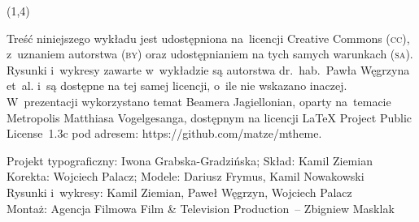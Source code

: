 {\begin{frame}[standout]
\begin{textblock}{4.2}
    \end{textblock}





    \begin{textblock}{11}(1,4)

      \begin{flushleft}

        \mdseries

        \footnotesize

        \RaggedRight

        \color{jFrametitleFGColor}

        Treść niniejszego wykładu jest udostępniona na~licencji
        Creative Commons (\textsc{cc}), z~uzna\-niem autorstwa
        (\textsc{by}) oraz udostępnianiem na tych samych warunkach
        (\textsc{sa}). Rysunki i~wy\-kresy zawarte w~wykładzie są
        autorstwa dr.~hab.~Pawła Węgrzyna et~al. i~są dostępne
        na tej samej licencji, o~ile nie wskazano inaczej.
        W~prezentacji wykorzystano temat Beamera Jagiellonian,
        oparty na~temacie Metropolis Matthiasa Vogelgesanga,
        dostępnym na licencji \LaTeX{} Project Public License~1.3c
        pod adresem: 
        {https://github.com/matze/mtheme}.

        Projekt typograficzny: Iwona Grabska-Gradzińska;
        Skład: Kamil Ziemian \\
        Korekta: Wojciech Palacz;
        Modele: Dariusz Frymus, Kamil Nowakowski \\
        Rysunki i~wykresy: Kamil Ziemian, Paweł Węgrzyn, Wojciech Palacz \\
        Montaż: Agencja Filmowa Film \& Television Production~-- Zbigniew
        Masklak

      \end{flushleft}

    \end{textblock}

  \end{frame}





  \begin{frame}[standout]


    \begingroup

    \color{jFrametitleFGColor}

    #1

    \endgroup

  \end{frame}
}










